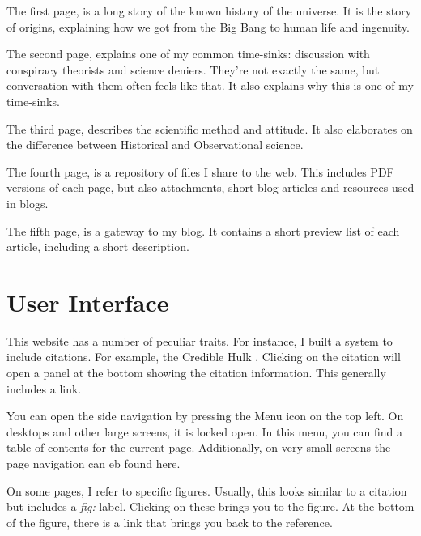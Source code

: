 \begin{multicols}{2}
The first page,  is a long story of the known history of the universe. It is the story of origins, explaining how we got from the Big Bang to human life and ingenuity.

The second page,  explains one of my common time-sinks: discussion with conspiracy theorists and science deniers. They're not exactly the same, but conversation with them often feels like that. It also explains why this is one of my time-sinks.

The third page,  describes the scientific method and attitude. It also elaborates on the difference between Historical and Observational science.

The fourth page,  is a repository of files I share to the web. This includes PDF versions of each page, but also attachments, short blog articles and resources used in blogs. 

The fifth page,  is a gateway to my blog. It contains a short preview list of each article, including a short description. 

\section{User Interface}

This website has a number of peculiar traits. For instance, I built a system to include citations. For example, the Credible Hulk \cite{crediblehulk}. Clicking on the citation will open a panel at the bottom showing the citation information. This generally includes a link.

You can open the side navigation by pressing the Menu icon on the top left. On desktops and other large screens, it is locked open. In this menu, you can find a table of contents for the current page. Additionally, on very small screens the page navigation can eb found here.

On some pages, I refer to specific figures. Usually, this looks similar to a citation but includes a \emph{fig:} label. Clicking on these brings you to the figure. At the bottom of the figure, there is a link that brings you back to the reference.
\end{multicols}